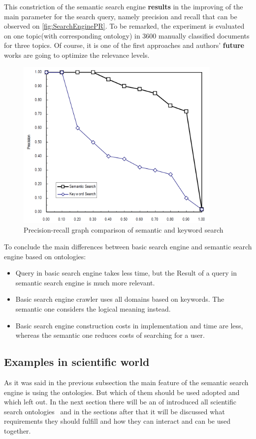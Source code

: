 		This constriction of the semantic search engine \textbf{results} in the improving of the main parameter for the search query, namely precision and recall that can be observed on \autoref{fig:SearchEnginePR}. To be remarked, the experiment is evaluated on one topic(with corresponding ontology) in  3600 manually classified documents for three topics. Of course, it is one of the first approaches and authors' \textbf{future} works are going to optimize the relevance levels.
		\begin{figure}
			\centering
			\includegraphics[width=10cm]{images/SearchEnginePR.PNG}
			\caption{Precision-recall graph comparison of semantic and keyword search\cite{Fang05}}
			\label{fig:SearchEnginePR}
		\end{figure}
		To conclude the main differences between basic search engine and semantic search engine based on ontologies\cite[p.653]{Gup12}:
			\begin{itemize}
				\item Query in basic search engine takes less time, but the  Result of a query in semantic search engine is much more relevant.
				\item Basic search engine crawler uses all domains based on keywords. The semantic one considers the logical meaning instead. 
				\item Basic search engine construction costs in implementation and time are less, whereas the semantic one reduces costs of searching for a user.   
			\end{itemize} 
		\subsection{Examples in scientific world}
		As it was said in the previous subsection the main feature of the semantic search engine is using the ontologies. But which of them should be used adopted and which left out. In the next section there will be an of introduced all scientific search ontologies \frqq \ and in the sections after that it will be discussed what requirements they should fulfill and how they can interact and can be used together.
		
